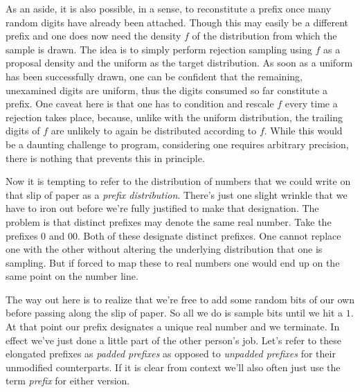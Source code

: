 As an aside, it is also possible, in a sense, to reconstitute a prefix once many random digits have already been attached. Though this may easily be a different prefix and one does now need the density $f$ of the distribution from which the sample is drawn. The idea is to simply perform rejection sampling using $f$ as a proposal density and the uniform as the target distribution. As soon as a uniform has been successfully drawn, one can be confident that the remaining, unexamined digits are uniform, thus the digits consumed so far constitute a prefix. One caveat here is that one has to condition and rescale $f$ every time a rejection takes place, because, unlike with the uniform distribution, the trailing digits of $f$ are unlikely to again be distributed according to $f$. While this would be a daunting challenge to program, considering one requires arbitrary precision, there is nothing that prevents this in principle.

Now it is tempting to refer to the distribution of numbers that we could write on that slip of paper as a \textit{prefix distribution}. There's just one slight wrinkle that we have to iron out before we're fully justified to make that designation. The problem is that distinct prefixes may denote the same real number. Take the prefixes $0$ and $00$. Both of these designate distinct prefixes. One cannot replace one with the other without altering the underlying distribution that one is sampling. But if forced to map these to real numbers one would end up on the same point on the number line.

The way out here is to realize that we're free to add some random bits of our own before passing along the slip of paper. So all we do is sample bits until we hit a $1$. At that point our prefix designates a unique real number and we terminate. In effect we've just done a little part of the other person's job. Let's refer to these elongated prefixes as \textit{padded prefixes} as opposed to \textit{unpadded prefixes} for their unmodified counterparts. If it is clear from context we'll also often just use the term \textit{prefix} for either version.